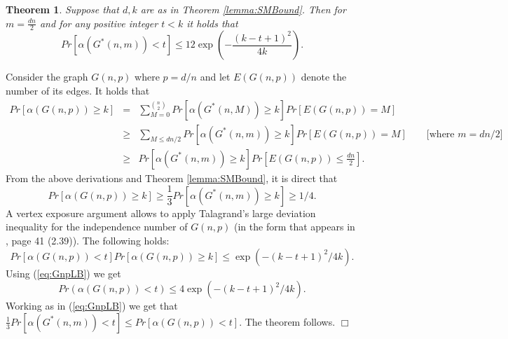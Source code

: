 \documentclass[a4paper,10pt]{article}
\makeatletter
\newtheorem{theorem}{Theorem}\renewcommand{\thetheorem}{\arabic{theorem}}
\newenvironment{proof}{\noindent{\bf Proof\@:}}{\hfill $\Box$\\}
\makeatother
\begin{document}
\begin{theorem}\label{thrm:TalagrandTailBound}
Suppose that $d,k$ are as in Theorem \ref{lemma:SMBound}. 
Then for $m=\frac{dn}{2}$ and for any positive integer $t<k$ 
it holds that
	$$Pr[\alpha(G^*(n,m))<t]\leq12\exp\left(-\frac{(k-t+1)^2}{4k}\right).$$
\end{theorem}
\begin{proof}
Consider the graph $G(n,p)$ where $p=d/n$ and let $E(G(n,p))$
denote the number of its edges. It holds that
\begin{eqnarray*}
Pr[\alpha(G(n,p))\geq k]&=&
\sum_{M=0}^{{n\choose 2}} Pr[\alpha(G^*(n,M))\geq k]Pr[E(G(n,p))=M] \\
&\geq & \sum_{M\leq dn/2}Pr[\alpha(G^*(n,m))\geq k]Pr[E(G(n,p))=M]
\qquad \mbox{[where $m=dn/2$]}\\ 
&\geq & Pr[\alpha(G^*(n,m))\geq k]Pr\left[E(G(n,p))\leq \frac{dn}2\right].
\end{eqnarray*}
From the above derivations and Theorem \ref{lemma:SMBound}, 
it is direct that
\begin{equation}\label{eq:GnpLB}
Pr[\alpha(G(n,p))\geq k]\geq \frac{1}{3}Pr[\alpha(G^*(n,m))\geq k]\geq 1/4.
\end{equation}
A vertex exposure argument allows to apply Talagrand's large 
deviation inequality for the independence number of $G(n,p)$
(in the form that appears in \cite{janson}, page 41 (2.39)).
The following holds:
\begin{displaymath}
Pr[\alpha(G(n,p))<t]Pr[\alpha(G(n,p))\geq k]
\leq \exp\left( -{(k-t+1)^2}/{4k} \right).
\end{displaymath}
Using (\ref{eq:GnpLB}) we get
\begin{displaymath}
Pr(\alpha(G(n,p))<t)\leq 4 \exp\left( -{(k-t+1)^2}/{4k} \right).
\end{displaymath}
Working as in (\ref{eq:GnpLB}) we get that
$
\frac{1}{3}Pr[\alpha(G^*(n,m))<t]\leq Pr[\alpha(G(n,p))<t].
$
The theorem follows.
\end{proof}
\end{document}
